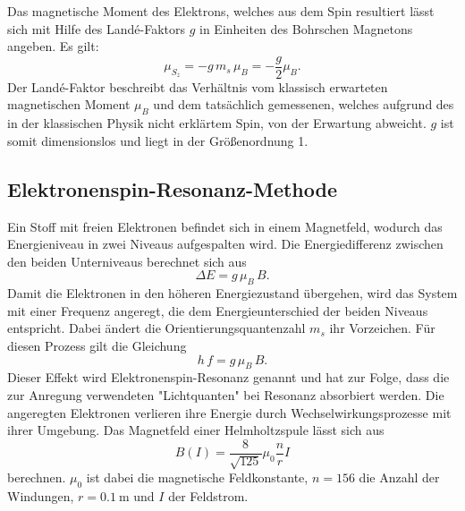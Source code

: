 Das magnetische Moment des Elektrons, welches aus dem Spin resultiert lässt sich mit Hilfe des Landé-Faktors $g$ in Einheiten des Bohrschen Magnetons angeben. Es gilt:
\begin{equation}
  \mu_{S_z} = -g\,m_s\,\mu_B = -\frac{g}{2}\mu_B.
\end{equation}
Der Landé-Faktor beschreibt das Verhältnis vom klassisch erwarteten magnetischen Moment $\mu_B$ und dem tatsächlich gemessenen, welches aufgrund des in der klassischen Physik nicht erklärtem Spin, von der Erwartung abweicht. $g$ ist somit dimensionslos und liegt in der Größenordnung 1.

\subsection{Elektronenspin-Resonanz-Methode}
Ein Stoff mit freien Elektronen befindet sich in einem Magnetfeld, wodurch das Energieniveau in zwei Niveaus aufgespalten wird. Die Energiedifferenz zwischen den beiden Unterniveaus berechnet sich aus
\begin{equation}
  \Delta E = g\,\mu_B\,B.
\end{equation}
Damit die Elektronen in den höheren Energiezustand übergehen, wird das System mit einer Frequenz angeregt, die dem Energieunterschied der beiden Niveaus entspricht. Dabei ändert die Orientierungsquantenzahl $m_s$ ihr Vorzeichen. Für diesen Prozess gilt die Gleichung
\begin{equation}
\label{eqn:g}
  h\,f=g\,\mu_B\,B.
\end{equation}
Dieser Effekt wird Elektronenspin-Resonanz genannt und hat zur Folge, dass die zur Anregung verwendeten "Lichtquanten" bei Resonanz absorbiert werden. Die angeregten Elektronen verlieren ihre Energie durch Wechselwirkungsprozesse mit ihrer Umgebung.
Das Magnetfeld einer Helmholtzspule lässt sich aus
\begin{equation}
\label{eqn:spule}
  B(I)=\frac{8}{\sqrt{125}}\mu_0\frac{n}{r}I
\end{equation}
berechnen. $\mu_0$ ist dabei die magnetische Feldkonstante, $n=156$ die Anzahl der Windungen, $r=\SI{0,1}{\meter}$ und $I$ der Feldstrom.
